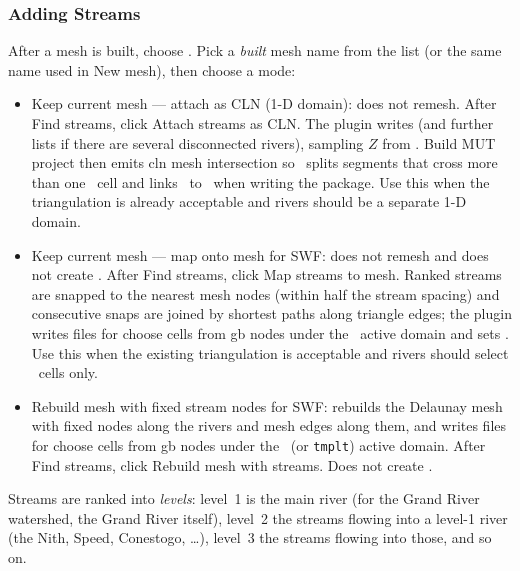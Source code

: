         \subsubsection{Adding Streams}
        \label{qgis:MeshStreams} 
        After a mesh is built, choose .  Pick a {\em built} mesh name from the list (or the same name used in {\sf New mesh}), then choose a mode:
        \begin{itemize}
        \item {\sf Keep current mesh --- attach as CLN} (1-D domain): does not remesh.  After {\sf Find streams}, click {\sf Attach streams as CLN}.  The plugin writes  (and further lists if there are several disconnected rivers), sampling $Z$ from .  {\sf Build MUT project} then emits {\sf cln mesh intersection} so \mut\ splits segments that cross more than one \gwf\ cell and links \cln\ to \gwf\ when writing the package.  Use this when the triangulation is already acceptable and rivers should be a separate 1-D domain.
        \item {\sf Keep current mesh --- map onto mesh for SWF}: does not remesh and does not create \cln.  After {\sf Find streams}, click {\sf Map streams to mesh}.  Ranked streams are snapped to the nearest mesh nodes (within half the stream spacing) and consecutive snaps are joined by shortest paths along triangle edges; the plugin writes  files for {\sf choose cells from gb nodes} under the \swf\ active domain and sets .  Use this when the existing triangulation is acceptable and rivers should select \swf\ cells only.
        \item {\sf Rebuild mesh with fixed stream nodes for SWF}: rebuilds the Delaunay mesh with fixed nodes along the rivers and mesh edges along them, and writes  files for {\sf choose cells from gb nodes} under the \swf\ (or {\tt tmplt}) active domain.  After {\sf Find streams}, click {\sf Rebuild mesh with streams}.  Does not create \cln.
        \end{itemize}
        Streams are ranked into {\em levels}: level~1 is the main river (for the Grand River watershed, the Grand River itself), level~2 the streams flowing into a level-1 river (the Nith, Speed, Conestogo, \ldots), level~3 the streams flowing into those, and so on.
